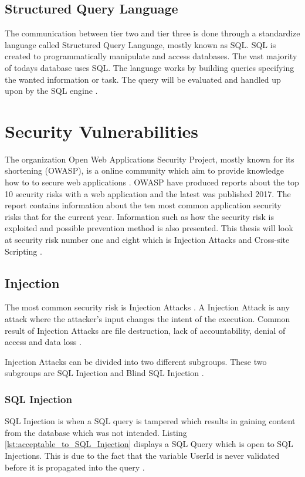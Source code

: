 \subsection{Structured Query Language}
The communication between tier two and tier three is done through a standardize language called Structured Query Language, mostly known as SQL. SQL is created to programmatically manipulate and access databases. The vast majority of todays database uses SQL. The language works by building queries specifying the wanted information or task. The query will be evaluated and handled up upon by the SQL engine \parencite{DarieCristian2003TPGt}.


\section{Security Vulnerabilities}
The organization Open Web Applications Security Project, mostly known for its shortening (OWASP), is a online community which aim to provide knowledge how to to secure web applications \parencite{OpenWebApplicationSecurityProject}. OWASP have produced reports about the top 10 security risks with a web application and the latest was published 2017. The report contains information about the ten most common application security risks that for the current year. Information such as how the security risk is exploited and possible prevention method is also presented. This thesis will look at security risk number one and eight which is Injection Attacks and Cross-site Scripting \parencite{OWASP2017}.


\subsection{Injection}
The most common security risk is Injection Attacks \parencite{OWASP2017}. A Injection Attack is any attack where the attacker's input changes the intent of the execution. Common result of Injection Attacks are file destruction, lack of accountability, denial of access and data loss \parencite{Secure_Web}.

Injection Attacks can be divided into two different subgroups. These two subgroups are SQL Injection and Blind SQL Injection \parencite{Secure_Web}.


\subsubsection{SQL Injection}
SQL Injection is when a SQL query is tampered which results in gaining content from the database which was not intended. Listing \ref{lst:acceptable_to_SQL_Injection} displays a SQL Query which is open to SQL Injections. This is due to the fact that the variable UserId is never validated before it is propagated into the query \parencite{JustinClarke-Salt2009SIAa, Secure_Web}.

